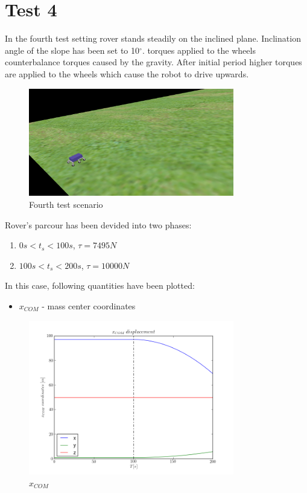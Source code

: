 \newpage
\section{Test 4}
\label{Sec:test_4}

In the fourth test setting rover stands steadily on the inclined plane.
Inclination angle of the slope has been set to 10$^\circ$. torques applied to the wheels counterbalance torques caused by
the gravity. After initial period higher torques are applied to the wheels which cause the robot to drive upwards.

\begin{figure}[H]
  \centering
    \includegraphics[width=0.8\textwidth]{run_4}
  \caption{Fourth test scenario}
\end{figure}

\noindent Rover's parcour has been devided into two phases:

\begin{enumerate} 
  \item $0s < t_s < 100s$, $\tau = 7495N$           
  \item $100s < t_s < 200s$, $\tau = 10000N$        
\end{enumerate}

\noindent In this case, following quantities have been plotted:

\begin{itemize}
  \item $x_{COM}$ - mass center coordinates
\end{itemize}

\begin{figure}[H]
  \centering
    \includegraphics[width=0.8\textwidth]{xCOM4}
  \caption{$x_{COM}$}
\end{figure}

